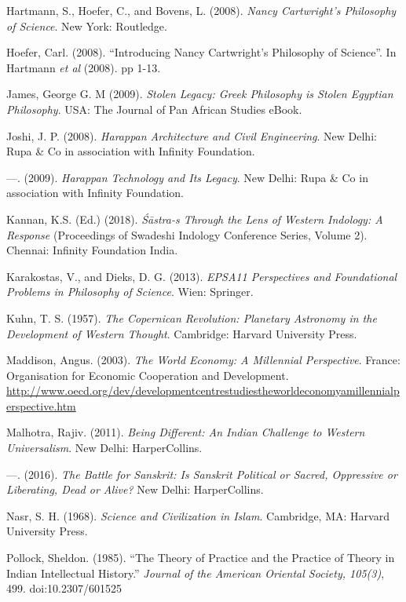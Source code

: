 \begin{thebibliography}{99}
  Hartmann, S., Hoefer, C., and Bovens, L. (2008). \textit{Nancy Cartwright's Philosophy of Science}. New York: Routledge.

  Hoefer, Carl. (2008). “Introducing Nancy Cartwright’s Philosophy of Science”. In Hartmann \textit{et al} (2008). pp 1-13.

  James, George G. M (2009). \textit{Stolen Legacy: Greek Philosophy is Stolen Egyptian Philosophy}. USA: The Journal of Pan African Studies eBook.

  Joshi, J. P. (2008). \textit{Harappan Architecture and Civil Engineering}. New Delhi: Rupa \& Co in association with Infinity Foundation.

  ---. (2009). \textit{Harappan Technology and Its Legacy}. New Delhi: Rupa \& Co in association with Infinity Foundation.

  Kannan, K.S. (Ed.) (2018). \textit{Śāstra-s Through the Lens of Western Indology: A Response} (Proceedings of Swadeshi Indology Conference Series, Volume 2). Chennai: Infinity Foundation India.

  Karakostas, V., and Dieks, D. G. (2013). \textit{EPSA11 Perspectives and Foundational Problems in Philosophy of Science}. Wien: Springer.

  Kuhn, T. S. (1957). \textit{The Copernican Revolution: Planetary Astronomy in the Development of Western Thought}. Cambridge: Harvard University Press.

  Maddison, Angus. (2003). \textit{The World Economy: A Millennial Perspective}. France: Organisation for Economic Cooperation and Development. \url{http://www.oecd.org/dev/developmentcentrestudiestheworldeconomyamillennialperspective.htm}

  Malhotra, Rajiv. (2011). \textit{Being Different: An Indian Challenge to Western Universalism}. New Delhi: HarperCollins.

  ---. (2016). \textit{The Battle for Sanskrit: Is Sanskrit Political or Sacred, Oppressive or Liberating, Dead or Alive?} New Delhi: HarperCollins.

  Nasr, S. H. (1968). \textit{Science and Civilization in Islam}. Cambridge, MA: Harvard University Press.

  Pollock, Sheldon. (1985). “The Theory of Practice and the Practice of Theory in Indian Intellectual History.” \textit{Journal of the American Oriental Society, 105(3)}, 499. doi:10.2307/601525


\end{thebibliography}

